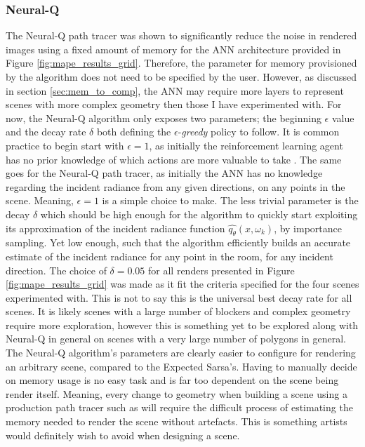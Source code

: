 \documentclass[../dissertation.tex]{subfiles}
\begin{document}
\subsubsection{Neural-Q}
 The Neural-Q path tracer was shown to significantly reduce the noise in rendered images using a fixed amount of memory for the ANN architecture provided in Figure \ref{fig:mape_results_grid}. Therefore, the parameter for memory provisioned by the algorithm does not need to be specified by the user. However, as discussed in section \ref{sec:mem_to_comp}, the ANN may require more layers to represent scenes with more complex geometry then those I have experimented with. For now, the Neural-Q algorithm only exposes two parameters; the beginning $\epsilon$ value and the decay rate $\delta$ both defining the $\epsilon$-\textit{greedy} policy to follow. It is common practice to begin start with $\epsilon = 1$, as initially the reinforcement learning agent has no prior knowledge of which actions are more valuable to take \cite{mnih2013playing, van2016deep, mnih2015human}. The same goes for the Neural-Q path tracer, as initially the ANN has no knowledge regarding the incident radiance from any given directions, on any points in the scene. Meaning, $\epsilon = 1$ is a simple choice to make. The less trivial parameter is the decay $\delta$ which should be high enough for the algorithm to quickly start exploiting its approximation of the incident radiance function $\hat{q_\theta}(x, \omega_k)$, by importance sampling. Yet low enough, such that the algorithm efficiently builds an accurate estimate of the incident radiance for any point in the room, for any incident direction. The choice of $\delta = 0.05$ for all renders presented in Figure \ref{fig:mape_results_grid} was made as it fit the criteria specified for the four scenes experimented with. This is not to say this is the universal best decay rate for all scenes. It is likely scenes with a large number of blockers and complex geometry require more exploration, however this is something yet to be explored along with Neural-Q in general on scenes with a very large number of polygons in general.\\
 
The Neural-Q algorithm's parameters are clearly easier to configure for rendering an arbitrary scene, compared to the Expected Sarsa's. Having to manually decide on memory usage is no easy task and is far too dependent on the scene being render itself. Meaning, every change to geometry when building a scene using a production path tracer such as \cite{georgiev2018arnold, christensen2018renderman, hyperion} will require the difficult process of estimating the memory needed to render the scene without artefacts. This is something artists would definitely wish to avoid when designing a scene.
\end{document}
